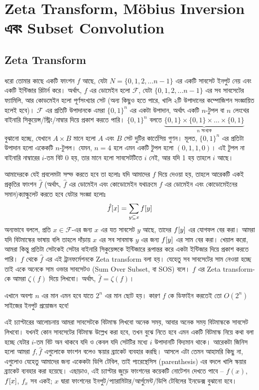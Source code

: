 \chapter{Zeta Transform, M{\"o}bius Inversion এবং Subset Convolution}

\section{Zeta Transform}

ধরো তোমার কাছে একটি ফাংশন $f$ আছে, যেটা $N = \{0, 1, 2, \ldots
n-1\}$ এর একটি
সাবসেট ইনপুট নেয় এবং একটি ইন্টিজার রিটার্ন করে। অর্থাৎ, $f$ এর ডোমেইন হলো
$\mathcal{F}$, যেটা $\{0, 1, 2, \ldots n-1\}$ এর সব সাবসেটের ফ্যামিলি, আর
কোডমেইন হলো পূর্ণসংখ্যার সেট (অন্য কিছুও হতে পারে, খালি ২টি উপাদানের
কম্পোজিশন সংজ্ঞায়িত হলেই হবে)। $\mathcal{F}$ এর প্রতিটি উপাদানকে এমরা $\{0,
1\}^n$ এর একটা উপাদান, অর্থাৎ একটি $n$-টুপল বা $n$ লেংথের বাইনারি
সিকুয়েন্স/স্ট্রিং/নাম্বার দিয়ে প্রকাশ করতে পারি। $\{0,1\}^n$ বলতে
$\underbrace{\{0,1\} \times \{0,1\} \times
\dots \times \{0,1\}}_{\text{$n$ সংখ্যক}}$ বুঝানো হচ্ছে, যেখানে $A \times B$
মানে হলো $A$ এবং $B$ সেট দুটির কার্তেসিয় গুণন। মূলত, $\{0,1\}^n$ এর প্রতিটা
উপাদান হলো একেকটি $n$-টুপল। যেমন, $n=4$ হলে এমন একটি টুপল হলো $\left(0, 1,
1, 0 \right)$। এই টুপল না বাইনারি নাম্বারের $i$-তম বিট
0 হয়, তার মানে হলো সাবসেটটিতে $i$ নেই, আর যদি 1 হয় তাহলে $i$ আছে।

আমাদেরকে যেই প্রবলেমটা সল্ভ করতে হবে তা হলোঃ যদি আমাদের $f$ দিয়ে দেওয়া হয়,
তাহলে আরেকটি একই প্রকৃতির ফাংশন $\hat{f}$ (অর্থাৎ, $\hat{f}$ এর ডোমেইন এবং
কোডোমেইন যথাক্রমে $f$ এর ডোমেইন এবং কোডোমেইনের সমান)ক্যাল্কুলেট করতে হবে
যেটার সংজ্ঞা হলোঃ
\[
  \hat{f}[x] = \sum_{y \subseteq x} f[y]
\]
অন্যভাবে বললে, প্রতি $x \in \mathcal{F}$-এর জন্য $x$ এর যত সাবসেট $y$ আছে,
তাদের
$f[y]$ এর যোগফল বের করা। আমরা যদি বিটমাস্কের ভাষায় বলি তাহলে দাঁড়ায় $x$
এর সব সাবমাস্ক $y$ এর জন্য $f[y]$ এর সাম বের করা। খেয়াল করো, আমরা কিন্তু
প্রতিটা সেটকেই সেটার বাইনারি সিকুয়েন্সকে ইন্টিজারে রূপান্তর করে একটা ইন্টিজার
দিয়ে প্রকাশ করতে পারি। $f$ থেকে $\hat{f}$ এর এই ট্রানফর্মেশনকে Zeta transform
বলা হয়। যেহেতু সব সাবসেটের সাম নেওয়া হচ্ছে তাই একে অনেকে সাম ওভার
সাবসেটও (Sum Over Subset, বা SOS) বলে। $f$ এর Zeta transform-কে আমরা
$\zeta(f)$ দিয়ে লিখবো। অর্থাৎ, $\hat{f} = \zeta(f)$।

এখানে অবশ্য $n$ এর মান এমন হবে যাতে $2^n$ এর মান ছোট হয়। কারণ $f$ কে ডিফাইন
করতেই তো $O(2^n)$ সাইজের ইনপুট প্রয়োজন হবে!

এই চ্যাপ্টারের আলোচনায় আমরা সাবসেটকে বিটমাস্ক লিখবো অনেক সময়, আবার অনেক সময়
বিটমাস্ককে সাবসেট লিখবো। যখনই কোন সাবসেটের বিটমাস্ক উল্লেখ করা হবে, তখন বুঝে
নিতে হবে এমন একটি বিটমাস্ক নিয়ে কথা বলা হচ্ছে যেটার $i$-তম বিট অন থাকবে যদি ও
কেবল যদি সেটটির মধ্যে $i$ উপাদানটি বিদ্যমান থাকে। আরেকটা জিনিস হলো আমরা $f,
\hat{f}$ এগুলোকে ফাংশন বলেও স্কয়ার ব্র্যাকেট ব্যবহার করছি। আসলে এটা তেমন
আহামরি কিছু না, এগুলোও যেহেতু আমাদের জন্য একেকটা ডিপি টেবিল, তাই প্যরেন্থেসিস
(parenthesis) এর বদলে খালি স্কয়ার ব্র্যাকেট ব্যবহার করা হয়েছে। এছাড়াও, এই
চ্যাপ্টার জুড়ে ফাংশনের কয়েকটি নোটেশন দেখতে পাবে -- $f(x)$, $f[x]$, $f_x$
সব একই; $x$ দ্বারা ফাংশনের ইনপুট/প্যারামিটার/আর্গুমেন্ট/ডিপি টেবিলের ইনডেক্স
বুঝানো হবে।


